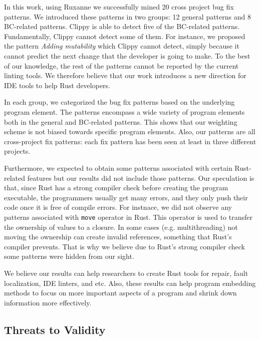 In this work, using Ruxanne we successfully mined 20 cross project bug fix patterns. We introduced these patterns in two groups: 12 general patterns and 8 BC-related patterns. Clippy is able to detect five of the BC-related patterns. Fundamentally, Clippy cannot detect some of them. For instance, we proposed the pattern \textit{Adding mutability} which Clippy cannot detect, simply because it cannot predict the next change that the developer is going to make. To the best of our knowledge, the rest of the patterns cannot be reported by the current linting tools. We therefore believe that our work introduces a new direction for IDE tools to help Rust developers.

In each group, we categorized the bug fix patterns based on the underlying program element. The patterns encompass a wide variety of program elements both in the general and BC-related patterns. This shows that our weighting scheme is not biased towards specific program elements. Also, our patterns are all cross-project fix patterns: each fix pattern has been seen at least in three different projects.

Furthermore, we expected to obtain some patterns associated with certain Rust-related features but our results did not include those patterns. Our speculation is that, since Rust has a strong compiler check before creating the program executable, the programmers usually get many errors, and they only push their code once it is free of compile errors. For instnace, we did not observe any patterns associated with \verb+move+ operator in Rust. This operator is used to transfer the ownership of values to a closure. In some cases (e.g. multithreading) not moving the ownership can create invalid references, something that Rust's compiler prevents. That is why we believe due to Rust's strong compiler check some patterns were hidden from our sight.

We believe our results can help researchers to create Rust tools for repair, fault localization, IDE linters, and etc. Also, these results can help program embedding methods to focus on more important aspects of a program and shrink down information more effectively.

\subsection{Threats to Validity}

